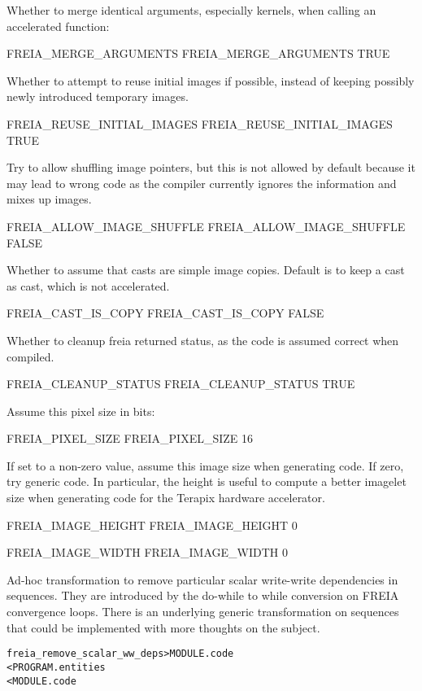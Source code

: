 \documentclass[a4paper]{report}
\newenvironment{PipsMake}{\begin{alltt}}{\end{alltt}}
\begin{document}
Whether to merge identical arguments, especially kernels, when calling
an accelerated function:
\begin{PipsProp}{FREIA_MERGE_ARGUMENTS}
FREIA_MERGE_ARGUMENTS TRUE
\end{PipsProp}

Whether to attempt to reuse initial images if possible, instead
of keeping possibly newly introduced temporary images.
\begin{PipsProp}{FREIA_REUSE_INITIAL_IMAGES}
FREIA_REUSE_INITIAL_IMAGES TRUE
\end{PipsProp}

Try to allow shuffling image pointers, but this is not allowed by
default because it may lead to wrong code as the compiler currently
ignores the information and mixes up images.
\begin{PipsProp}{FREIA_ALLOW_IMAGE_SHUFFLE}
FREIA_ALLOW_IMAGE_SHUFFLE FALSE
\end{PipsProp}

Whether to assume that casts are simple image copies.
Default is to keep a cast as cast, which is not accelerated.
\begin{PipsProp}{FREIA_CAST_IS_COPY}
FREIA_CAST_IS_COPY FALSE
\end{PipsProp}

Whether to cleanup freia returned status, as the code is assumed correct
when compiled.
\begin{PipsProp}{FREIA_CLEANUP_STATUS}
FREIA_CLEANUP_STATUS TRUE
\end{PipsProp}

Assume this pixel size in bits:
\begin{PipsProp}{FREIA_PIXEL_SIZE}
FREIA_PIXEL_SIZE 16
\end{PipsProp}

If set to a non-zero value, assume this image size when generating code.
If zero, try generic code.
In particular, the height is useful to compute a better imagelet size
when generating code for the Terapix hardware accelerator.
\begin{PipsProp}{FREIA_IMAGE_HEIGHT}
FREIA_IMAGE_HEIGHT 0
\end{PipsProp}
\begin{PipsProp}{FREIA_IMAGE_WIDTH}
FREIA_IMAGE_WIDTH 0
\end{PipsProp}

Ad-hoc transformation to remove particular scalar write-write dependencies
in sequences. They are introduced by the do-while to while conversion
on FREIA convergence loops. There is an underlying generic transformation
on sequences that could be implemented with more thoughts on the subject.
\begin{PipsMake}
freia_remove_scalar_ww_deps > MODULE.code
        < PROGRAM.entities
        < MODULE.code
\end{PipsMake}
\end{document}
